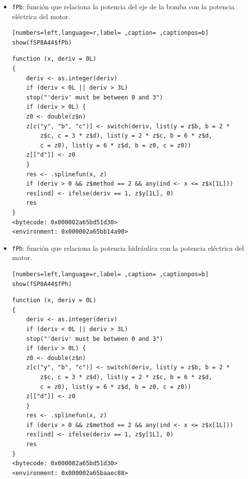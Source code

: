 \begin{itemize}
\begin{itemize}
\begin{verbatim}
function (x, deriv = 0L) 
{
    deriv <- as.integer(deriv)
    if (deriv < 0L || deriv > 3L) 
	stop("'deriv' must be between 0 and 3")
    if (deriv > 0L) {
	z0 <- double(z$n)
	z[c("y", "b", "c")] <- switch(deriv, list(y = z$b, b = 2 * 
	    z$c, c = 3 * z$d), list(y = 2 * z$c, b = 6 * z$d, 
	    c = z0), list(y = 6 * z$d, b = z0, c = z0))
	z[["d"]] <- z0
    }
    res <- .splinefun(x, z)
    if (deriv > 0 && z$method == 2 && any(ind <- x <= z$x[1L])) 
	res[ind] <- ifelse(deriv == 1, z$y[1L], 0)
    res
}
<bytecode: 0x000002a65bd51d30>
<environment: 0x000002a65bb2c978>
\end{verbatim}

\item \texttt{fPb}: función que relaciona la potencia del eje de la bomba con la potencia eléctrica del motor.
\begin{lstlisting}[numbers=left,language=r,label= ,caption= ,captionpos=b]
show(fSP8A44$fPb)
\end{lstlisting}

\begin{verbatim}
function (x, deriv = 0L) 
{
    deriv <- as.integer(deriv)
    if (deriv < 0L || deriv > 3L) 
	stop("'deriv' must be between 0 and 3")
    if (deriv > 0L) {
	z0 <- double(z$n)
	z[c("y", "b", "c")] <- switch(deriv, list(y = z$b, b = 2 * 
	    z$c, c = 3 * z$d), list(y = 2 * z$c, b = 6 * z$d, 
	    c = z0), list(y = 6 * z$d, b = z0, c = z0))
	z[["d"]] <- z0
    }
    res <- .splinefun(x, z)
    if (deriv > 0 && z$method == 2 && any(ind <- x <= z$x[1L])) 
	res[ind] <- ifelse(deriv == 1, z$y[1L], 0)
    res
}
<bytecode: 0x000002a65bd51d30>
<environment: 0x000002a65bb14a90>
\end{verbatim}

\item \texttt{fPh}: función que relaciona la potencia hidráulica con la potencia eléctrica del motor.
\begin{lstlisting}[numbers=left,language=r,label= ,caption= ,captionpos=b]
show(fSP8A44$fPh)
\end{lstlisting}

\begin{verbatim}
function (x, deriv = 0L) 
{
    deriv <- as.integer(deriv)
    if (deriv < 0L || deriv > 3L) 
	stop("'deriv' must be between 0 and 3")
    if (deriv > 0L) {
	z0 <- double(z$n)
	z[c("y", "b", "c")] <- switch(deriv, list(y = z$b, b = 2 * 
	    z$c, c = 3 * z$d), list(y = 2 * z$c, b = 6 * z$d, 
	    c = z0), list(y = 6 * z$d, b = z0, c = z0))
	z[["d"]] <- z0
    }
    res <- .splinefun(x, z)
    if (deriv > 0 && z$method == 2 && any(ind <- x <= z$x[1L])) 
	res[ind] <- ifelse(deriv == 1, z$y[1L], 0)
    res
}
<bytecode: 0x000002a65bd51d30>
<environment: 0x000002a65baaec88>
\end{verbatim}


\end{itemize}
\end{itemize}
